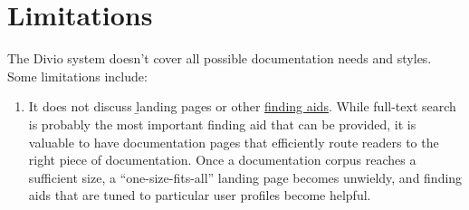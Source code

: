 \section*{Limitations}

The Divio system doesn't cover all possible documentation needs and styles. Some
limitations include:

\begin{enumerate}
  \item It does not discuss \b{landing pages} or other
  \href{https://en.wikipedia.org/wiki/Finding_aid}{finding aids}. While
  full-text search is probably the most important finding aid that can be
  provided, it is valuable to have documentation pages that efficiently route
  readers to the right piece of documentation. Once a documentation corpus
  reaches a sufficient size, a “one-size-fits-all” landing page becomes
  unwieldy, and finding aids that are tuned to particular user profiles become
  helpful.
\end{enumerate}